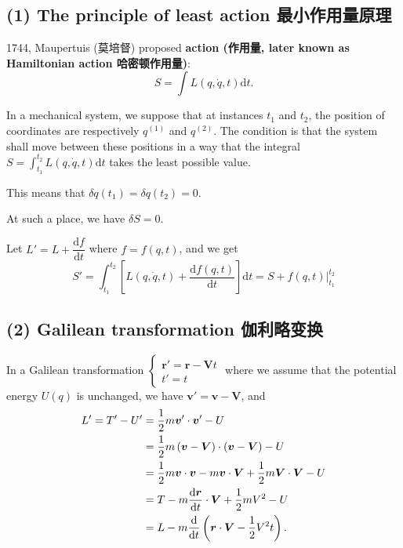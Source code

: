\subsection*{(1) The principle of least action
最小作用量原理}\label{the-principle-of-least-action-ux6700ux5c0fux4f5cux7528ux91cfux539fux7406}

1744, Maupertuis (莫培督) proposed \textbf{action (作用量, later known
as Hamiltonian action 哈密顿作用量)}:
\[S = \int L(q, \dot{q}, t) \mathrm{d} t.\]

In a mechanical system, we suppose that at instances \(t_1\) and
\(t_2\), the position of coordinates are respectively \(q^{(1)}\) and
\(q^{(2)}\). The condition is that the system shall move between these
positions in a way that the integral
\(\displaystyle S = \int_{t_1}^{t_2} L(q, \dot{q}, t) \mathrm{d} t\)
takes the least possible value.

This means that \(\delta q(t_1) = \delta q(t_2) = 0\).

At such a place, we have \(\delta S = 0.\)

Let \(L' = L + \dfrac{\mathrm{d}f}{\mathrm{d}t}\) where \(f = f(q, t)\),
and we get
\[S' = \int_{t_1}^{t_2} \left[ L(q, \dot{q}, t) + \dfrac{\mathrm{d}f(q, t)}{\mathrm{d}t} \right] \mathrm{d}t = S + f(q, t) \Big|_{t_1}^{t_2}\]

\subsection*{(2) Galilean transformation
伽利略变换}\label{galilean-transformation-ux4f3dux5229ux7565ux53d8ux6362}

In a Galilean transformation
\(\left\{\begin{array}{l}  \boldsymbol{r}' = \boldsymbol{r} - \boldsymbol{V}t \\  t' = t \end{array} \right.\)
where we assume that the potential energy \(U(q)\) is unchanged, we have
\(\boldsymbol{v}' = \boldsymbol{v} - \boldsymbol{V}\), and
\begin{align*}
    L' = T' - U' & = {1 \over 2}m \boldsymbol{v}' \cdot \boldsymbol{v}' - U \\
    & = {1 \over 2}m \left( \boldsymbol{v} - \boldsymbol{V} \right) \cdot \left( \boldsymbol{v} - \boldsymbol{V} \right) - U \\
    & = {1 \over 2}m \boldsymbol{v} \cdot \boldsymbol{v} - m \boldsymbol{v} \cdot \boldsymbol{V} + {1 \over 2}m \boldsymbol{V} \cdot \boldsymbol{V} - U \\
    & = T - m \dfrac{\mathrm{d} \boldsymbol{r}}{\mathrm{d}t} \cdot \boldsymbol{V} + {1 \over 2} mV^2 - U \\
    & = L - m \dfrac{\mathrm{d}}{\mathrm{d}t} \left( \boldsymbol{r} \cdot \boldsymbol{V} - {1 \over 2}V^2 t \right).
\end{align*}

